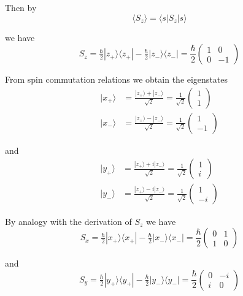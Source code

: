 Then by
\begin{equation*}
\langle S_z\rangle=\langle s|S_z|s\rangle
\end{equation*}

we have
\begin{equation*}
S_z=\tfrac{\hbar}{2}|z_+\rangle\langle z_+|-\tfrac{\hbar}{2}|z_-\rangle\langle z_-|
=\frac{\hbar}{2}\begin{pmatrix}1&0\\0&-1\end{pmatrix}
\end{equation*}

From spin commutation relations we obtain the eigenstates
\begin{align*}
|x_+\rangle&=\frac{|z_+\rangle+|z_-\rangle}{\sqrt2}=\frac{1}{\sqrt2}\begin{pmatrix}1\\1\end{pmatrix}
\\
|x_-\rangle&=\frac{|z_+\rangle-|z_-\rangle}{\sqrt2}=\frac{1}{\sqrt2}\begin{pmatrix}1\\-1\end{pmatrix}
\end{align*}

and
\begin{align*}
|y_+\rangle&=\frac{|z_+\rangle+i|z_-\rangle}{\sqrt2}=\frac{1}{\sqrt2}\begin{pmatrix}1\\i\end{pmatrix}
\\
|y_-\rangle&=\frac{|z_+\rangle-i|z_-\rangle}{\sqrt2}=\frac{1}{\sqrt2}\begin{pmatrix}1\\-i\end{pmatrix}
\end{align*}

By analogy with the derivation of $S_z$ we have
\begin{equation*}
S_x=\tfrac{\hbar}{2}|x_+\rangle\langle x_+|-\tfrac{\hbar}{2}|x_-\rangle\langle x_-|
=\frac{\hbar}{2}\begin{pmatrix}0&1\\1&0\end{pmatrix}
\end{equation*}

and
\begin{equation*}
S_y=\tfrac{\hbar}{2}|y_+\rangle\langle y_+|-\tfrac{\hbar}{2}|y_-\rangle\langle y_-|
=\frac{\hbar}{2}\begin{pmatrix}0&-i\\i&0\end{pmatrix}
\end{equation*}









